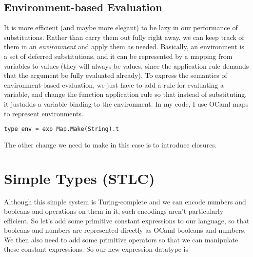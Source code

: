 \documentclass[pageno]{jpaper}
\newcommand{\step}{\longrightarrow}
\newcommand{\bstep}{\Downarrow}
\begin{document}
{\subsection{Environment-based Evaluation}
It is more efficient (and maybe more elegant) to be lazy in our performance of substitutions.
Rather than carry them out fully right away, we can keep track of them in an \textit{environment}
and apply them as needed.  Basically, an environment is a set of deferred substitutions, and it can
be represented by a mapping from variables to values (they will always be values,
since the application rule demands that the argument be fully evaluated already).
To express the semantics of environment-based evaluation, we just have to add a rule for evaluating a variable,
and change the function application rule so that instead of substituting, it justadds a variable binding to the environment.
In my code, I use OCaml maps to represent environments.

\begin{lstlisting}
type env = exp Map.Make(String).t
\end{lstlisting}

The other change we need to make in this case is to introduce closures.


\section{Simple Types (STLC)}
Although this simple system is Turing-complete and we can encode numbers and booleans and operations on them in it, such encodings aren't particularly efficient.
So let's add some primitive constant expressions to our language, so that booleans and numbers
are represented directly as OCaml booleans and numbers. We then also need to add
some primitive operators so that we can manipulate these constant expressions.
So our new expression datatype is

}
\end{document}
